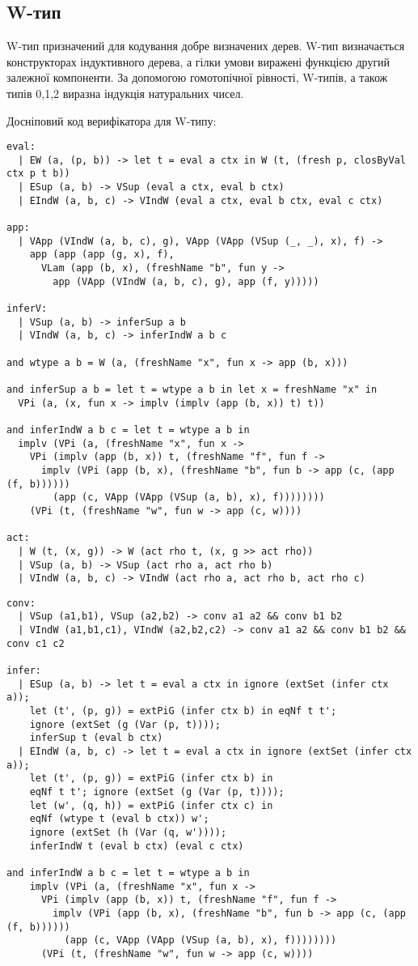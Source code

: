 \newpage
\subsection*{W-тип}
W-тип призначений для кодування добре визначених дерев.
W-тип визначається конструкторах індуктивного дерева,
а гілки умови виражені функцією другий залежної компоненти.
За допомогою гомотопічної рівності, W-типів, а також типів 0,1,2
виразна індукція натуральних чисел.

Досніповий код верифікатора для W-типу:
\begin{lstlisting}
eval:
  | EW (a, (p, b)) -> let t = eval a ctx in W (t, (fresh p, closByVal ctx p t b))
  | ESup (a, b) -> VSup (eval a ctx, eval b ctx)
  | EIndW (a, b, c) -> VIndW (eval a ctx, eval b ctx, eval c ctx)

app: 
  | VApp (VIndW (a, b, c), g), VApp (VApp (VSup (_, _), x), f) ->
    app (app (app (g, x), f),
      VLam (app (b, x), (freshName "b", fun y ->
        app (VApp (VIndW (a, b, c), g), app (f, y)))))

inferV:
  | VSup (a, b) -> inferSup a b
  | VIndW (a, b, c) -> inferIndW a b c

and wtype a b = W (a, (freshName "x", fun x -> app (b, x)))

and inferSup a b = let t = wtype a b in let x = freshName "x" in
  VPi (a, (x, fun x -> implv (implv (app (b, x)) t) t))

and inferIndW a b c = let t = wtype a b in
  implv (VPi (a, (freshName "x", fun x ->
    VPi (implv (app (b, x)) t, (freshName "f", fun f ->
      implv (VPi (app (b, x), (freshName "b", fun b -> app (c, (app (f, b))))))
        (app (c, VApp (VApp (VSup (a, b), x), f))))))))
    (VPi (t, (freshName "w", fun w -> app (c, w))))

act:
  | W (t, (x, g)) -> W (act rho t, (x, g >> act rho))
  | VSup (a, b) -> VSup (act rho a, act rho b)
  | VIndW (a, b, c) -> VIndW (act rho a, act rho b, act rho c)
\end{lstlisting}

\newpage
\begin{lstlisting}
conv:
  | VSup (a1,b1), VSup (a2,b2) -> conv a1 a2 && conv b1 b2
  | VIndW (a1,b1,c1), VIndW (a2,b2,c2) -> conv a1 a2 && conv b1 b2 && conv c1 c2

infer:
  | ESup (a, b) -> let t = eval a ctx in ignore (extSet (infer ctx a));
    let (t', (p, g)) = extPiG (infer ctx b) in eqNf t t';
    ignore (extSet (g (Var (p, t))));
    inferSup t (eval b ctx)
  | EIndW (a, b, c) -> let t = eval a ctx in ignore (extSet (infer ctx a));
    let (t', (p, g)) = extPiG (infer ctx b) in
    eqNf t t'; ignore (extSet (g (Var (p, t))));
    let (w', (q, h)) = extPiG (infer ctx c) in
    eqNf (wtype t (eval b ctx)) w';
    ignore (extSet (h (Var (q, w'))));
    inferIndW t (eval b ctx) (eval c ctx)

and inferIndW a b c = let t = wtype a b in
    implv (VPi (a, (freshName "x", fun x ->
      VPi (implv (app (b, x)) t, (freshName "f", fun f ->
        implv (VPi (app (b, x), (freshName "b", fun b -> app (c, (app (f, b))))))
          (app (c, VApp (VApp (VSup (a, b), x), f))))))))
      (VPi (t, (freshName "w", fun w -> app (c, w))))
\end{lstlisting}

